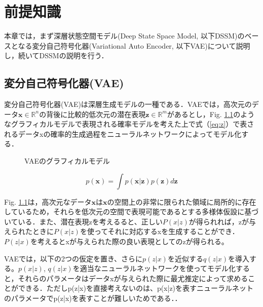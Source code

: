 \chapter{前提知識}
\label{chap:prerequisite}
本章では，まず深層状態空間モデル(Deep State Space Model, 以下DSSM)のベースとなる変分自己符号化器(Variational Auto Encoder, 以下VAE)について説明し，続いてDSSMの説明を行う．

\section{変分自己符号化器(VAE)}
\label{section:vae}
変分自己符号化器(VAE)は深層生成モデルの一種である．VAEでは，高次元のデータ$\bm{x} \in \mathbb{R}^n$の背後に比較的低次元の潜在表現$\bm{z} \in \mathbb{R}^m$があるとし，Fig. \ref{fig:vae}のようなグラフィカルモデルで表現される確率モデルを考えた上で式（\ref{eq:z}）で表されるデータxの確率的生成過程をニューラルネットワークによってモデル化する．

\begin{figure}[tbp]
  \begin{center}
  \caption{VAEのグラフィカルモデル}
  \label{fig:vae}
  \end{center}
  \end{figure}
  
\begin{equation}
  p(\bm{x}) = \int p(\bm{x}|\bm{z}) p(\bm{z}) d\bm{z} \label{eq:vae}
\end{equation}

Fig. \ref{fig:vae}は，高次元なデータ$\bm{x}$は$\bm{x}$の空間上の非常に限られた領域に局所的に存在しているため，それらを低次元の空間で表現可能であるとする多様体仮設に基づいている．また、潜在表現zを考えるると、正しい$P(x|z)$が得られれば，zが与えられたときに$P(x|z)$を使ってそれに対応するxを生成することができ．$P(z|x)$を考えるとxが与えられた際の良い表現としてのzが得られる。

VAEでは，以下の2つの仮定を置き、さらに$p(z|x)$を近似する$q(z|x)$を導入する。$p(x|z)$, $q(z|x)$を適当なニューラルネットワークを使ってモデル化すると，それらのパラメータはデータxが与えられた際に最尤推定によって求めることができる．ただしp(z|x)を直接考えないのは、p(x|z)を表すニューラルネットのパラメータでp(z|x)を表すことが難しいためである．．

